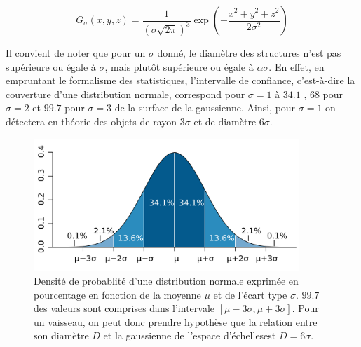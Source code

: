 \begin{equation}
  G_\sigma(x,y,z) = \frac{1}{ (\sigma\sqrt{2\pi})^3 }\exp(-\frac{x^2 + y^2 + z^2}{2\sigma^2 })
  \label{eq:Gaussienne 3D}
\end{equation}

Il convient de noter que pour un $\sigma$ donné, le diamètre des structures n'est pas supérieure ou égale à $\sigma$, mais plutôt supérieure ou égale à $\alpha\sigma$. En effet, en empruntant le formalisme des statistiques, l'intervalle de confiance, c'est-à-dire la couverture d'une distribution normale, correspond pour $\sigma=1$ à $34.1$ \percent{}, $68$ \percent{}pour $\sigma=2$ et $99.7$ \percent{}pour $\sigma=3$ de la surface de la gaussienne. Ainsi, pour $\sigma=1$ on détectera en théorie des objets de rayon $3\sigma$ et de diamètre $6\sigma$.  

\begin{figure}[!ht]
  \centering
  \includegraphics[height=5cm]{Images/normal_distribution_probability_coverage.png}
  \caption{Densité de probablité d'une distribution normale exprimée en pourcentage en fonction de la moyenne $\mu$ et de l'écart type $\sigma$. $99.7$ \percent{}des valeurs sont comprises dans l'intervale $[\mu-3\sigma,\mu+3\sigma]$. Pour un vaisseau, on peut donc prendre hypothèse que la relation entre son diamètre $D$ et la gaussienne de l'espace d'échellesest $D=6\sigma$.\protect\footnotemark}
  \label{fig:normal_distribution_probability_coverage}
\end{figure}


